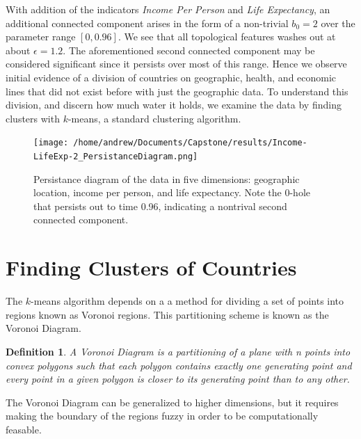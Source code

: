 \documentclass[11pt]{amsart}
\newtheorem{defn} [equation]{Definition}
\theoremstyle{remark}	  \newtheorem*{remark}{Remark}
\numberwithin{equation}{section}
\begin{document}
With addition of the indicators \emph{Income Per Person} and \emph{Life Expectancy}, an additional connected component arises in the form of a non-trivial $b_0 = 2 $ over the parameter range $[0,0.96]$. We see that all topological features washes out at about $\epsilon = 1.2$. The aforementioned second connected component may be considered significant since it persists over most of this range. Hence we observe initial evidence of a division of countries on geographic, health, and economic lines that did not exist before with just the geographic data. To understand this division, and discern how much water it holds, we examine the data by finding clusters with $k$-means, a standard clustering algorithm.

\begin{figure}
\centering
\texttt{[image: /home/andrew/Documents/Capstone/results/Income-LifeExp-2\_PersistanceDiagram.png]}
\caption{Persistance diagram of the data in five dimensions: geographic location, income per person, and life expectancy. Note the 0-hole that persists out to time 0.96, indicating a nontrival second connected component.}
\label{fig:geography}
\end{figure}


\section{Finding Clusters of Countries}

The $k$-means algorithm depends on a a method for dividing a set of points into regions known as  Voronoi regions. This partitioning scheme is known as the Voronoi Diagram.

\begin{defn} \cite{voronoi}
  A \emph{Voronoi Diagram} is a partitioning of a plane with n points into convex polygons such that each polygon contains exactly one generating point and every point in a given polygon is closer to its generating point than to any other. 
\end{defn}

The Voronoi Diagram can be generalized to higher dimensions, but it requires making the boundary of the regions fuzzy in order to be computationally feasable.  
\end{document}
